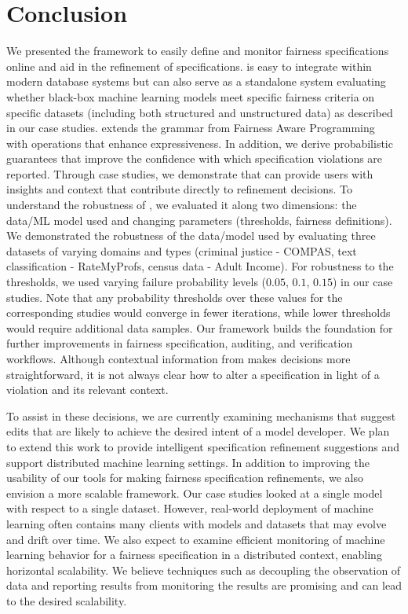 \section{Conclusion}

We presented the \AVOIRmethodname{} framework to easily define and monitor fairness specifications online and aid in the refinement of specifications. \AVOIRmethodname{} is easy to integrate within modern database systems but can also serve as a standalone system evaluating whether black-box machine learning models meet specific fairness criteria on specific datasets (including both structured and unstructured data) as described in our case studies.
\AVOIRmethodname{} extends the grammar from Fairness Aware Programming~\cite{albarghouthi2019fairness} with operations that enhance expressiveness.
In addition, we derive probabilistic guarantees that improve the confidence with which specification violations are reported.
Through case studies, we demonstrate that \AVOIRmethodname{} can provide users with insights and context that contribute directly to refinement decisions.
To understand the robustness of \AVOIRmethodname{}, we evaluated it along two dimensions: the data/ML model used and changing parameters (thresholds, fairness definitions).
We demonstrated the robustness of the data/model used by evaluating three datasets of varying domains and types (criminal justice - COMPAS, text classification - RateMyProfs, census data - Adult Income). 
For robustness to the thresholds, we used varying failure probability levels ($0.05$, $0.1$, $0.15$) in our case studies.
Note that any probability thresholds over these values for the corresponding studies would converge in fewer iterations, while lower thresholds would require additional data samples.
Our framework builds the foundation for further improvements in fairness specification, auditing, and verification workflows.
Although contextual information from \AVOIRmethodname{} makes decisions more straightforward, it is not always clear how to alter a specification in light of a violation and its relevant context.

To assist in these decisions, we are currently examining mechanisms that suggest edits that are likely to achieve the desired intent of a model developer.
We plan to extend this work to provide intelligent specification refinement suggestions and support distributed machine learning settings.
In addition to improving the usability of our tools for making fairness specification refinements, we also envision a more scalable framework.
Our case studies looked at a single model with respect to a single dataset. 
However, real-world deployment of machine learning often contains many clients with models and datasets that may evolve and drift over time.
We also expect to examine efficient monitoring of machine learning behavior for a fairness specification in a distributed context, enabling horizontal scalability.
We believe techniques such as decoupling the observation of data and reporting results from monitoring the results are promising and can lead to the desired scalability.
